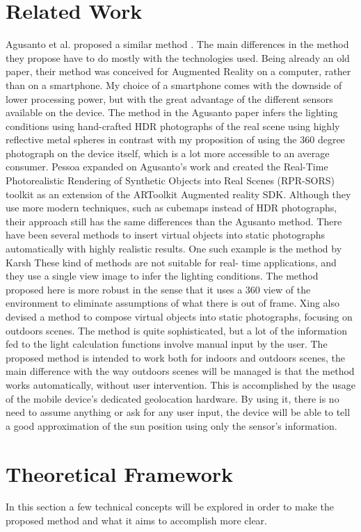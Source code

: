 \documentclass{article}
\begin{document}
\section{Related Work}
Agusanto et al. proposed a similar method \cite{agusanto2003}. The main differences in the method they propose have to do mostly with the technologies used. Being already an old paper, their method was conceived for Augmented Reality on a computer, rather than on a smartphone. My choice of a smartphone comes with the downside of lower processing power, but with the great advantage of the different sensors available on the device. The method in the Agusanto paper infers the lighting conditions using hand-crafted HDR photographs of the real scene using highly reflective metal spheres in contrast with my proposition of using the 360 degree photograph on the device itself, which is a lot more accessible to an average consumer.
Pessoa\cite{pessoa2011} expanded on Agusanto's work and created the Real-Time Photorealistic Rendering of Synthetic Objects into Real Scenes (RPR-SORS) toolkit as an extension of the ARToolkit Augmented reality SDK. Although they use more modern techniques, such as cubemaps instead of HDR photographs, their approach still has the same differences than the Agusanto method.
There have been several methods to insert virtual objects into static photographs automatically with highly realistic results. One such example is the method by Karsh \cite{karsh2014} These kind of methods are not suitable for real- time applications, and they use a single view image to infer the lighting conditions. The method proposed here is more robust in the sense that it uses a 360 view of the environment to eliminate assumptions of what there is out of frame.
Xing\cite{xing2013} also devised a method to compose virtual objects into static photographs, focusing on outdoors scenes. The method is quite sophisticated, but a lot of the information fed to the light calculation functions involve manual input by the user. The proposed method is intended to work both for indoors and outdoors scenes, the main difference with the way outdoors scenes will be managed is that the method works automatically, without user intervention. This is accomplished by the usage of the mobile device's dedicated geolocation hardware. By using it, there is no need to assume anything or ask for any user input, the device will be able to tell a good approximation of the sun position using only the sensor's information.
\section{Theoretical Framework}
In this section a few technical concepts will be explored in order to make the proposed method and what it aims to accomplish more clear.
\end{document}
